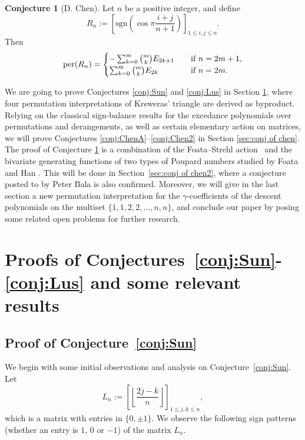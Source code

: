 \documentclass[11pt,reqno]{amsart}
\numberwithin{equation}{section}
\theoremstyle{plain}
\theoremstyle{definition}
\newtheorem{conj}[theorem]{Conjecture}
\def\per{\mathrm{per}}
\def\sgn{\mathrm{sgn}}
\def\l{\left}
\def\r{\right}
\def\per{{\rm per}}
\begin{document}
\begin{conj}[D. Chen]\label{conj:Chen3} Let $n$ be a positive integer, and define
$$R_n:=\left[\sgn\l(\cos\pi\frac{i+j}{n+1}\r)\right]_{1\le i,j\le n}.$$ Then
\begin{equation}\label{bino:chen}
\per(R_n)=\begin{cases}
-\sum_{k=0}^m\binom{m}{k}E_{2k+1}&\quad\text{if $n=2m+1$},\\
\sum_{k=0}^m\binom{m}{k}E_{2k}&\quad\text{if $n=2m$}.
\end{cases}
\end{equation}
\end{conj}

We are going to prove Conjectures \ref{conj:Sun} and \ref{conj:Lus} in Section \ref{sec:conj of sun}, where four permutation interpretations of Kreweras' triangle are derived as byproduct. Relying on the classical sign-balance results for the excedance polynomials over permutations and derangements, as well as certain elementary action on matrices, we will prove Conjectures \ref{conj:ChenA}--\ref{conj:Chen2} in Section \ref{sec:conj of chen}. The proof of Conjecture \ref{conj:Chen3} is a combination of the Foata--Strehl action~\cite{FSt} and the bivariate generating functions of two types of Poupard numbers studied by Foata and Han \cite{FH}. This will be done in Section~\ref{sec:conj of chen2}, where a conjecture posted to \cite[A005799]{oeis} by Peter Bala is also confirmed. Moreover, we will give in the last section a new permutation interpretation for the $\gamma$-coefficients of the descent polynomials on the multiset $\{1,1,2,2,\ldots,n,n\}$, and conclude our paper by posing some related open problems for further research.





\section{Proofs of Conjectures~\ref{conj:Sun}-\ref{conj:Lus} and some relevant results}\label{sec:conj of sun}


\subsection{Proof of Conjecture~\ref{conj:Sun}}
We begin with some initial observations and analysis on Conjecture~\ref{conj:Sun}. Let $$L_n:=\left[\left\lfloor\frac{2j-k}{n}\right\rfloor\right]_{1\le j,k\le n},$$ which is a matrix with entries in $\{0,\pm1\}$. We observe the following sign patterns (whether an entry is $1$, $0$ or $-1$) of the matrix $L_n$.
\end{document}

